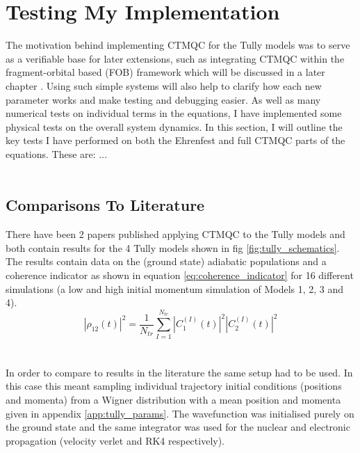 \section{Testing My Implementation}
The motivation behind implementing CTMQC for the Tully models was to serve as a verifiable base for later extensions, such as integrating CTMQC within the fragment-orbital based (FOB) \cite{spencer_fob-sh:_2016} framework which will be discussed in a later chapter \cite{chap:molecular_systems}. Using such simple systems will also help to clarify how each new parameter works and make testing and debugging easier. As well as many numerical tests on individual terms in the equations,  I have implemented some physical tests on the overall system dynamics. In this section, I will outline the key tests I have performed on both the Ehrenfest and full CTMQC parts of the equations. These are: ... %
\\\\
\subsection{Comparisons To Literature}
There have been 2 papers published applying CTMQC to the Tully models \cite{gossel_coupled-trajectory_2018, agostini_quantum-classical_2016} and both contain results for the 4 Tully models shown in fig \ref{fig:tully_schematics}. The results contain data on the (ground state) adiabatic populations and a coherence indicator as shown in equation \eqref{eq:coherence_indicator} for 16 different simulations (a low and high initial momentum simulation of Models 1, 2, 3 and 4). 
\begin{equation}
	|\rho_{12}(t)|^2 = \frac{1}{N_{tr}} \sum_{I=1}^{N_{tr}} |C_{1}^{(I)}(t)|^2 |C_{2}^{(I)}(t)|^2
	\label{eq:coherence_indicator}
\end{equation}
\\\\
In order to compare to results in the literature the same setup had to be used. In this case this meant sampling individual trajectory initial conditions (positions and momenta) from a Wigner distribution with a mean position and momenta given in appendix \ref{app:tully_params}. The wavefunction was initialised purely on the ground state and the same integrator was used for the nuclear and electronic propagation (velocity verlet and RK4 respectively).
